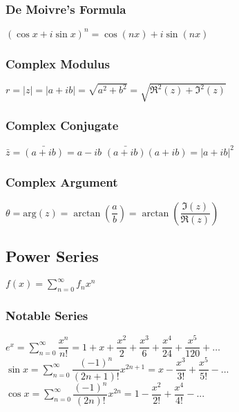 \subsubsection{De Moivre's Formula}				
\begin{itemize}
\itemt \( (\cos x + i\sin x)^n = \cos(nx) + i\sin(nx) \)
\end{itemize}				

\subsubsection{Complex Modulus}				
\begin{itemize}
\itemt \( r = |z| = |a+ib| = \sqrt{a^2+b^2} = \sqrt{\Re^2(z)+\Im^2(z)} \)
\end{itemize}

\subsubsection{Complex Conjugate}				
\begin{itemize}
\itemt \( \bar{z} = \bar{(a+ib)} = a-ib \)
\itemt \( \bar{(a+ib)}(a+ib) = |a+ib|^2 \)
\end{itemize}

\subsubsection{Complex Argument}
\begin{itemize}
\itemt \( \theta = \mathrm{arg} (z) = \arctan(\dfrac{a}{b}) = \arctan(\dfrac{\Im(z)}{\Re(z)}) \)
\end{itemize}		

\subsection{Power Series}
\begin{itemize}
\itemt \( f(x) = \sum\limits_{n=0}^{\infty} f_n x^n \)
\end{itemize}

\subsubsection{Notable Series}			
\begin{itemize}
\itemt \( e^x = \sum\limits_{n=0}^{\infty} \dfrac{x^n}{n!} = 1 + x + \dfrac{x^2}{2} + \dfrac{x^3}{6} + \dfrac{x^4}{24} + \dfrac{x^5}{120} + \dots \)					
\itemt \( \sin x = \sum\limits_{n=0}^{\infty} \dfrac{(-1)^n}{(2n+1)!}x^{2n+1} = x - \dfrac{x^3}{3!} + \dfrac{x^5}{5!} -... \)					
\itemt \(\cos x = \sum\limits_{n=0}^{\infty} \dfrac{(-1)^n}{(2n)!}x^{2n} = 1 - \dfrac{x^2}{2!} + \dfrac{x^4}{4!} - ...\)
\end{itemize}

